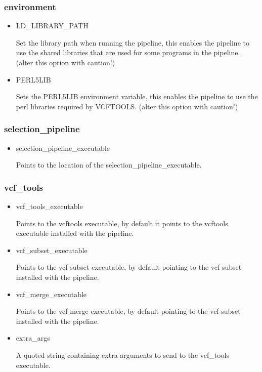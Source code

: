 \documentclass[a4paper,10pt]{article}
\begin{document}
\subsubsection{environment}
\begin{itemize}
\item LD\_LIBRARY\_PATH

Set the library path when running the pipeline, this enables the pipeline to use the shared libraries that are used for some programs in the pipeline. (alter this option with caution!)
\item PERL5LIB

Sets the PERL5LIB environment variable, this enables the pipeline to use the perl libraries required by VCFTOOLS. (alter this option with caution!)
\end{itemize}
\subsubsection{selection\_pipeline}
\begin{itemize}
\item selection\_pipeline\_executable

Points to the location of the selection\_pipeline\_executable. 
\end{itemize}
\subsubsection{vcf\_tools}
\begin{itemize}
\item vcf\_tools\_executable 

Points to the vcftools executable, by default it points to the vcftools executable installed with the pipeline.
\item vcf\_subset\_executable 

Points to the vcf-subset executable, by default pointing to the vcf-subset installed with the pipeline.
\item vcf\_merge\_executable

Points to the vcf-merge executable, by default pointing to the vcf-subset installed with the pipeline.
\item extra\_args 

A quoted string containing extra arguments to send to the vcf\_tools executable.
\end{itemize}
\end{document}
